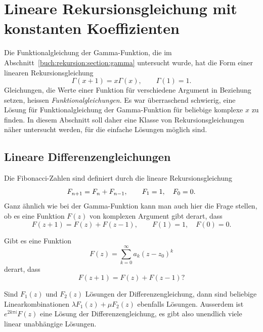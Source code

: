 %
%
%
\section{Lineare Rekursionsgleichung mit konstanten Koeffizienten
\label{buch:rekursion:section:linear}}
Die Funktionalgleichung der Gamma-Funktion, die im
Abschnitt~\ref{buch:rekursion:section:gamma} untersucht wurde,
hat die Form einer linearen Rekursionsgleichung
\[
\Gamma(x+1) = x\Gamma(x),\qquad \Gamma(1) = 1.
\]
Gleichungen, die Werte einer Funktion für verschiedene
Argument in Beziehung setzen, heissen {\em Funktionalgleichungen}.
%
Es war überraschend schwierig, eine Lösung für Funktionalgleichung
der Gamma-Funktion für beliebige komplexe $x$ zu finden.
In diesem Abschnitt soll daher eine Klasse von Rekursionsgleichungen
näher untersucht werden, für die einfache Lösungen möglich sind.

%
%
\subsection{Lineare Differenzengleichungen}
Die Fibonacci-Zahlen sind definiert durch die lineare Rekursionsgleichung
\begin{equation}
F_{n+1\mathstrut} = F_{n\mathstrut} + F_{n-1\mathstrut},
\qquad
F_1=1,\quad F_0=0.
\label{buch:rekursion:eqn:fibonacci}
\end{equation}
%
Ganz ähnlich wie bei der Gamma-Funktion kann man auch hier die Frage
stellen, ob es eine Funktion $F(z)$ von komplexen Argument gibt derart,
dass
\begin{equation}
F(z+1) = F(z) + F(z-1), \qquad F(1)=1,\quad F(0)=0.
\label{buch:rekursion:eqn:fibonaccikomplex}
\end{equation}

\begin{aufgabe}
Gibt es eine Funktion
\[
F(z) = \sum_{k=0}^\infty a_k (z-z_0)^k
\]
derart, dass
\[
F(z+1) = F(z)+F(z-1)?
\]
\end{aufgabe}

Sind $F_1(z)$ und $F_2(z)$ Lösungen der Differenzengleichung, dann
sind beliebige Linearkombinationen $\lambda F_1(z) + \mu F_2(z)$
ebenfalls Lösungen.
Ausserdem ist $e^{2k\pi i}F(z)$ eine Lösung der Differenzengleichung,
es gibt also unendlich viele linear unabhängige Lösungen.

